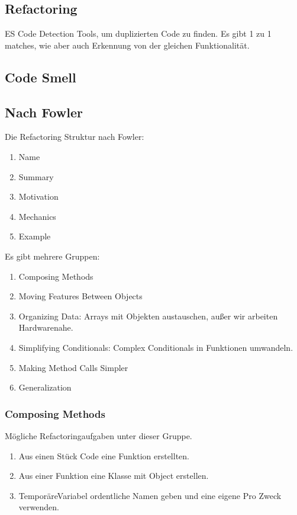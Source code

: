 \documentclass[a4paper]{article}
\begin{document}
\subsection{Refactoring}

ES Code Detection Tools, um duplizierten Code zu finden. Es gibt 1 zu 1 matches, wie aber auch Erkennung von der gleichen Funktionalität.

\subsection{Code Smell}


\subsection{Nach Fowler}

Die Refactoring Struktur nach Fowler:

\begin{enumerate}
    \item Name
    \item Summary
    \item Motivation
    \item Mechanics
    \item Example
\end{enumerate}

Es gibt mehrere Gruppen:

\begin{enumerate}
    \item Composing Methods
    \item Moving Features Between Objects
    \item Organizing Data: Arrays mit Objekten austauschen, außer wir arbeiten Hardwarenahe.
    \item Simplifying Conditionals: Complex Conditionals in Funktionen umwandeln.
    \item Making Method Calls Simpler
    \item Generalization
\end{enumerate}

\subsubsection{Composing Methods}

Mögliche Refactoringaufgaben unter dieser Gruppe.

\begin{enumerate}
    \item Aus einen Stück Code eine Funktion erstellten.
    \item Aus einer Funktion eine Klasse mit Object erstellen.
    \item TemporäreVariabel ordentliche Namen geben und eine eigene Pro Zweck verwenden.
\end{enumerate}
\end{document}
